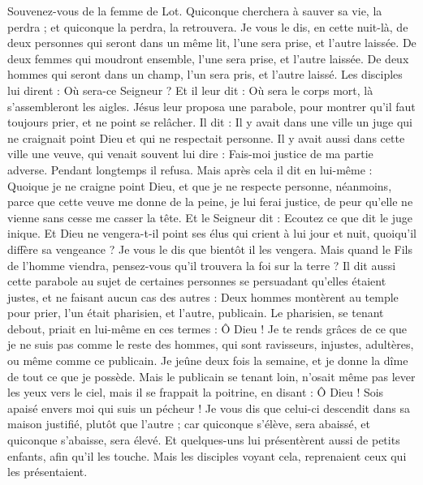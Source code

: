 \begin{multicols}{2}
{Souvenez-vous de la femme de Lot.
Quiconque cherchera à sauver sa vie, la perdra ; et quiconque la perdra, la retrouvera.
Je vous le dis, en cette nuit-là, de deux personnes qui seront dans un même lit, l’une sera prise, et l'autre laissée.
De deux femmes qui moudront ensemble, l'une sera prise, et l'autre laissée.
De deux hommes qui seront dans un champ, l'un sera pris, et l'autre laissé.
Les disciples lui dirent : Où sera-ce Seigneur ? Et il leur dit : Où sera le corps mort, là s'assembleront les aigles.
\VerseOne{}Jésus leur proposa une parabole, pour montrer qu'il faut toujours prier, et ne point se relâcher.
Il dit : Il y avait dans une ville un juge qui ne craignait point Dieu et qui ne respectait personne.
Il y avait aussi dans cette ville une veuve, qui venait souvent lui dire : Fais-moi justice de ma partie adverse.
Pendant longtemps il refusa. Mais après cela il dit en lui-même : Quoique je ne craigne point Dieu, et que je ne respecte personne,
néanmoins, parce que cette veuve me donne de la peine, je lui ferai justice, de peur qu'elle ne vienne sans cesse me casser la tête.
Et le Seigneur dit : Ecoutez ce que dit le juge inique.
Et Dieu ne vengera-t-il point ses élus qui crient à lui jour et nuit, quoiqu'il diffère sa vengeance ?
Je vous le dis que bientôt il les vengera. Mais quand le Fils de l'homme viendra, pensez-vous qu'il trouvera la foi sur la terre ?
Il dit aussi cette parabole au sujet de certaines personnes se persuadant qu’elles étaient justes, et ne faisant aucun cas des autres :
Deux hommes montèrent au temple pour prier, l'un était pharisien, et l'autre, publicain.
Le pharisien, se tenant debout, priait en lui-même en ces termes : Ô Dieu ! Je te rends grâces de ce que je ne suis pas comme le reste des hommes, qui sont ravisseurs, injustes, adultères, ou même comme ce publicain.
Je jeûne deux fois la semaine, et je donne la dîme de tout ce que je possède.
Mais le publicain se tenant loin, n'osait même pas lever les yeux vers le ciel, mais il se frappait la poitrine, en disant : Ô Dieu ! Sois apaisé envers moi qui suis un pécheur !
Je vous dis que celui-ci descendit dans sa maison justifié, plutôt que l'autre ; car quiconque s'élève, sera abaissé, et quiconque s'abaisse, sera élevé.
Et quelques-uns lui présentèrent aussi de petits enfants, afin qu'il les touche. Mais les disciples voyant cela, reprenaient ceux qui les présentaient.
}
\end{multicols}
